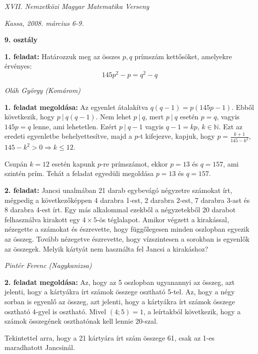 \documentclass[a4paper,10pt]{article}
\def\ki#1#2{\hfill {\it #1 (#2)}\medskip}
\begin{document}
\begin{center} \Large {\em XVII. Nemzetközi Magyar Matematika Verseny} \end{center}
\begin{center} \large{\em Kassa, 2008. március 6-9.} \end{center}
\smallskip
\begin{center} \large{\bf 9. osztály} \end{center}
\bigskip 

{\bf 1. feladat: } Határozzuk meg az összes $p, q$ prímszám kettősöket, amelyekre érvényes:
$$ 145p^2-p=q^2-q$$

\ki{Oláh György}{Komárom}\medskip

{\bf 1. feladat megoldása: } Az egyenlet átalakítva $q(q-1)=p(145p-1)$. Ebből következik, hogy 
$p~|~q(q-1)$. Nem lehet $p~|~q$, mert $p~|~q$ esetén $p=q$, vagyis $145p=q$ lenne, ami lehetetlen.
Ezért $p~|~q-1$ vagyis $q-1=kp$, $k\in\mathbb{N}$. Ezt az eredeti egyenletbe behelyettesítve, majd a $p$-t kifejezve,
kapjuk, hogy $\displaystyle{p=\frac{k+1}{145-k^2}}$, $145-k^2>0 \Rightarrow k\le 12$. 

Csupán $k=12$ esetén kapunk 
$p$-re prímszámot, ekkor $p=13$ és $q=157$, ami szintén prím. Tehát a feladat egyedüli megoldása $p=13$ és $q=157$.



\medskip
{\bf 2. feladat: } 
Jancsi unalmában 21 darab egybevágó négyzetre számokat írt, 
mégpedig a következőképpen
4 darabra 1-est, 
2 darabra 2-est, 
7 darabra 3-ast és 8 darabra 4-est írt. 
Egy más alkalommal ezekből a négyzetekből 20 darabot felhasználva kirakott egy $4 \times 5$-ös téglalapot. 
Amikor végzett a kirakással, nézegette a számokat és észrevette, hogy függőlegesen minden oszlopban egyezik az összeg. 
Tovább nézegetve észrevette, hogy vízszintesen a sorokban is egyenlők az összegek. 
Melyik kártyát nem használta fel Jancsi a kirakáshoz?

\ki{Pintér Ferenc}{Nagykanizsa}\medskip

{\bf 2. feladat megoldása: } Az, hogy az 5 oszlopban ugyanannyi az összeg, azt jelenti, hogy a kártyákra írt
számok összege osztható 5-tel. Az, hogy a négy sorban is egyenlő az összeg, azt jelenti, hogy a kártyákra írt
számok összege osztható 4-gyel is osztható. Mivel $(4;5)=1$, a leírtakból következik, hogy a számok összegének
oszthatónak kell lennie 20-szal.

Tekintettel arra, hogy a 21 kártyára írt szám összege 61, csak az 1-es maradhatott Jancsinál.
\end{document}
